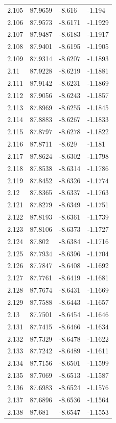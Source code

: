 \begin{tabular}{llll}
2.105 & 87.9659 & -8.616 & -1.194 \\
2.106 & 87.9573 & -8.6171 & -1.1929 \\
2.107 & 87.9487 & -8.6183 & -1.1917 \\
2.108 & 87.9401 & -8.6195 & -1.1905 \\
2.109 & 87.9314 & -8.6207 & -1.1893 \\
2.11 & 87.9228 & -8.6219 & -1.1881 \\
2.111 & 87.9142 & -8.6231 & -1.1869 \\
2.112 & 87.9056 & -8.6243 & -1.1857 \\
2.113 & 87.8969 & -8.6255 & -1.1845 \\
2.114 & 87.8883 & -8.6267 & -1.1833 \\
2.115 & 87.8797 & -8.6278 & -1.1822 \\
2.116 & 87.8711 & -8.629 & -1.181 \\
2.117 & 87.8624 & -8.6302 & -1.1798 \\
2.118 & 87.8538 & -8.6314 & -1.1786 \\
2.119 & 87.8452 & -8.6326 & -1.1774 \\
2.12 & 87.8365 & -8.6337 & -1.1763 \\
2.121 & 87.8279 & -8.6349 & -1.1751 \\
2.122 & 87.8193 & -8.6361 & -1.1739 \\
2.123 & 87.8106 & -8.6373 & -1.1727 \\
2.124 & 87.802 & -8.6384 & -1.1716 \\
2.125 & 87.7934 & -8.6396 & -1.1704 \\
2.126 & 87.7847 & -8.6408 & -1.1692 \\
2.127 & 87.7761 & -8.6419 & -1.1681 \\
2.128 & 87.7674 & -8.6431 & -1.1669 \\
2.129 & 87.7588 & -8.6443 & -1.1657 \\
2.13 & 87.7501 & -8.6454 & -1.1646 \\
2.131 & 87.7415 & -8.6466 & -1.1634 \\
2.132 & 87.7329 & -8.6478 & -1.1622 \\
2.133 & 87.7242 & -8.6489 & -1.1611 \\
2.134 & 87.7156 & -8.6501 & -1.1599 \\
2.135 & 87.7069 & -8.6513 & -1.1587 \\
2.136 & 87.6983 & -8.6524 & -1.1576 \\
2.137 & 87.6896 & -8.6536 & -1.1564 \\
2.138 & 87.681 & -8.6547 & -1.1553 \\

\end{tabular}
